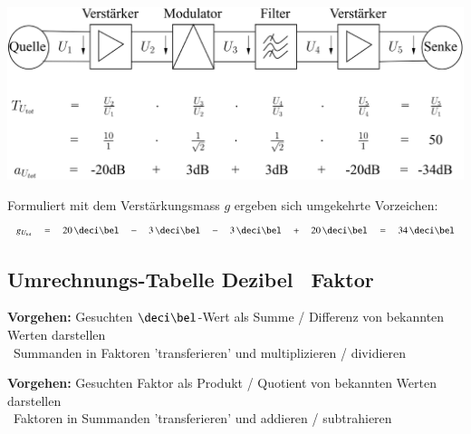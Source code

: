 
\includegraphics[width=0.9\columnwidth]{images/kaskadierung_verstaerkung_daempfung.png}

Formuliert mit dem Verstärkungsmass $g$ ergeben sich umgekehrte Vorzeichen:
$$ g_{U_{\rm tot}} \quad = \quad 20 \, \deci\bel \quad  - \quad 3 \, \deci\bel \quad -
    \quad 3 \, \deci\bel \quad + \quad 20 \, \deci\bel \quad = \quad 34 \, \deci\bel $$


\subsection{Umrechnungs-Tabelle Dezibel \textlrarrow\ Faktor}

\textbf{Vorgehen:} Gesuchten $\deci\bel$-Wert als Summe / Differenz von bekannten Werten darstellen\\
\textrightarrow\ Summanden in Faktoren 'transferieren' und multiplizieren / dividieren \medskip

\textbf{Vorgehen:} Gesuchten Faktor als Produkt / Quotient von bekannten Werten darstellen\\
\textrightarrow\ Faktoren in Summanden 'transferieren' und addieren / subtrahieren \medskip


